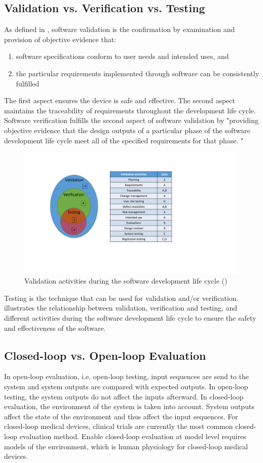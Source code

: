 \subsection{Validation vs. Verification vs. Testing}
As defined in \cite{fda2}, software validation is the confirmation by examination and provision of objective evidence that:
\begin{enumerate}
	\item software specifications conform to user needs and intended uses, and 
	\item the particular requirements implemented through software can be consistently fulfilled
\end{enumerate}
The first aspect ensures the device is safe and effective. The second aspect maintains the traceability of requirements throughout the development life cycle.
Software verification fulfills the second aspect of software validation by "providing objective evidence that the design outputs of a particular phase of the software development life cycle meet all of the specified requirements for that phase. "
\begin{figure}[t]
		\centering
		\includegraphics[width=\textwidth]{figs/validation.pdf}
		\caption{Validation activities during the software development life cycle (\cite{Vogel})}
		\label{fig:validation}
\end{figure}

Testing is the technique that can be used for validation and/or verification.  illustrates the relationship between validation, verification and testing, and different activities during the software development life cycle to ensure the safety and effectiveness of the software.
\subsection{Closed-loop vs. Open-loop Evaluation}
In open-loop evaluation, i.e. open-loop testing, input sequences are send to the system and system outputs are compared with expected outputs. In open-loop testing, the system outputs do not affect the inputs afterward. In closed-loop evaluation, the environment of the system is taken into account. System outputs affect the state of the environment and thus affect the input sequences. For closed-loop medical devices, clinical trials are currently the most common closed-loop evaluation method. Enable closed-loop evaluation at model level requires models of the environment, which is human physiology for closed-loop medical devices.

